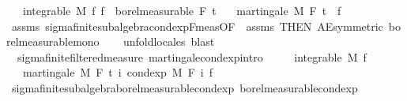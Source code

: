 \begin{isabellebody}
\ \ \ {\isachardoublequoteopen}integrable\ M\ f{\isachardoublequoteclose}\ {\isachardoublequoteopen}f\ {\isasymin}\ borel{\isacharunderscore}{\kern0pt}measurable\ {\isacharparenleft}{\kern0pt}F\ t\isanewline
\ \ \ {\isachardoublequoteopen}martingale\ M\ F\ t\ {\isacharparenleft}{\kern0pt}{\isasymlambda}{\isacharunderscore}{\kern0pt}{\isachardot}{\kern0pt}\ f{\isacharparenright}{\kern0pt}{\isachardoublequoteclose}\isanewline
%
\isadelimproof
\ \ %
\endisadelimproof
%
\isatagproof
{}\isamarkupfalse%
\ assms\ sigma{\isacharunderscore}{\kern0pt}finite{\isacharunderscore}{\kern0pt}subalgebra{\isachardot}{\kern0pt}cond{\isacharunderscore}{\kern0pt}exp{\isacharunderscore}{\kern0pt}F{\isacharunderscore}{\kern0pt}meas{\isacharbrackleft}{\kern0pt}OF\ {\isacharunderscore}{\kern0pt}\ assms{\isacharparenleft}{\kern0pt}{}{\isacharparenright}{\kern0pt}{\isacharcomma}{\kern0pt}\ THEN\ AE{\isacharunderscore}{\kern0pt}symmetric{\isacharbrackright}{\kern0pt}\ borel{\isacharunderscore}{\kern0pt}measurable{\isacharunderscore}{\kern0pt}mono\isanewline
\ \ \isamarkupfalse%
\ {\isacharparenleft}{\kern0pt}unfold{\isacharunderscore}{\kern0pt}locales{\isacharparenright}{\kern0pt}\ blast{\isacharplus}{\kern0pt}%
\endisatagproof
{\isafoldproof}%
%
\isadelimproof
\isanewline
%
\endisadelimproof
\isanewline
{}\isamarkupfalse%
\ {\isacharparenleft}{\kern0pt}\ sigma{\isacharunderscore}{\kern0pt}finite{\isacharunderscore}{\kern0pt}filtered{\isacharunderscore}{\kern0pt}measure{\isacharparenright}{\kern0pt}\ martingale{\isacharunderscore}{\kern0pt}cond{\isacharunderscore}{\kern0pt}exp{\isacharbrackleft}{\kern0pt}intro{\isacharbrackright}{\kern0pt}{\isacharcolon}{\kern0pt}\ \ \isanewline
\ \ \ {\isachardoublequoteopen}integrable\ M\ f{\isachardoublequoteclose}\isanewline
\ \ \ {\isachardoublequoteopen}martingale\ M\ F\ t\ {\isacharparenleft}{\kern0pt}{\isasymlambda}i{\isachardot}{\kern0pt}\ cond{\isacharunderscore}{\kern0pt}exp\ M\ {\isacharparenleft}{\kern0pt}F\ i{\isacharparenright}{\kern0pt}\ f{\isacharparenright}{\kern0pt}{\isachardoublequoteclose}\isanewline
%
\isadelimproof
\ \ %
\endisadelimproof
%
\isatagproof
{}\isamarkupfalse%
\ sigma{\isacharunderscore}{\kern0pt}finite{\isacharunderscore}{\kern0pt}subalgebra{\isachardot}{\kern0pt}borel{\isacharunderscore}{\kern0pt}measurable{\isacharunderscore}{\kern0pt}cond{\isacharunderscore}{\kern0pt}exp{\isacharprime}{\kern0pt}\ borel{\isacharunderscore}{\kern0pt}measurable{\isacharunderscore}{\kern0pt}cond{\isacharunderscore}{\kern0pt}exp\ \isanewline

\end{isabellebody}
